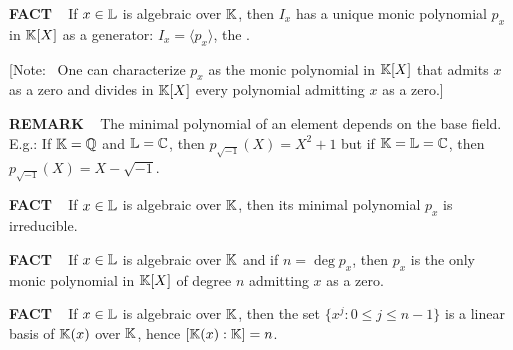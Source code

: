 \vspace{0.1cm}

\begin{x}{\small\bf FACT} \ %
If $x \in \mathbb{L}$ is algebraic over $\mathbb{K}$, then $I_x$ has a unique monic polynomial $p_x$ in $\mathbb{K}[X]$ as a generator: 
$I_x = \langle p_x \rangle$, the 
.

\vspace{0.1cm}

[Note: \  One can characterize $p_x$ as the monic polynomial in $\mathbb{K}[X]$ that admits $x$ as a zero and divides in $\mathbb{K}[X]$ 
every polynomial admitting $x$ as a zero.]

\end{x}

\vspace{0.1cm}


\begin{x}{\small\bf REMARK} \ %
The minimal polynomial of an element depends on the base field.  
E.g.: If $\mathbb{K} = \mathbb{Q}$ and $\mathbb{L} = \mathbb{C}$, then $p_{\sqrt{-1}}(X) = X^2 + 1$ but if $\mathbb{K} = \mathbb{L} = \mathbb{C}$, then 
$p_{\sqrt{-1}}(X) = X - \sqrt{-1}$.
\end{x}

\vspace{0.1cm}

\begin{x}{\small\bf FACT} \ %
If $x \in \mathbb{L}$ is algebraic over $\mathbb{K}$, then its minimal polynomial $p_x$ is irreducible.
\end{x}

\vspace{0.1cm}


\begin{x}{\small\bf FACT} \ %
If $x \in \mathbb{L}$ is algebraic over $\mathbb{K}$ and if $n = \deg p_x$, then $p_x$ is the only monic polynomial in $\mathbb{K}[X]$ 
of degree $n$ admitting $x$ as a zero.
\end{x}

\vspace{0.1cm}


\begin{x}{\small\bf FACT} \ %
If $x \in \mathbb{L}$ is algebraic over $\mathbb{K}$, then the set $\{x^j: 0 \leq j \leq n-1\}$ is a linear basis of $\mathbb{K}(x)$ over $\mathbb{K}$, 
hence $[\mathbb{K}(x):\mathbb{K}] = n$.
\end{x}

\vspace{0.1cm}

